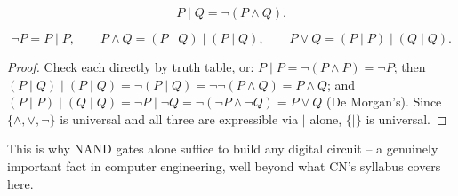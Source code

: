 \bigskip
\begin{definition}
\[
P \mid Q = \neg(P\wedge Q).
\]
\end{definition}

\begin{proposition}
\[
\neg P = P\mid P, \qquad P\wedge Q = (P\mid Q)\mid(P\mid Q), \qquad P\vee Q = (P\mid P)\mid(Q\mid Q).
\]
\end{proposition}
\begin{proof}
Check each directly by truth table, or: $P\mid P = \neg(P\wedge P) = \neg P$; then $(P\mid Q)\mid(P\mid Q) = \neg(P\mid Q) = \neg\neg(P\wedge Q) = P\wedge Q$; and $(P\mid P)\mid(Q\mid Q) = \neg P \mid \neg Q = \neg(\neg P\wedge\neg Q) = P\vee Q$ (De Morgan's). Since $\{\wedge,\vee,\neg\}$ is universal and all three are expressible via $\mid$ alone, $\{\mid\}$ is universal.
\end{proof}

\begin{note}
This is why NAND gates alone suffice to build any digital circuit -- a genuinely important fact in computer engineering, well beyond what CN's syllabus covers here.
\end{note}

